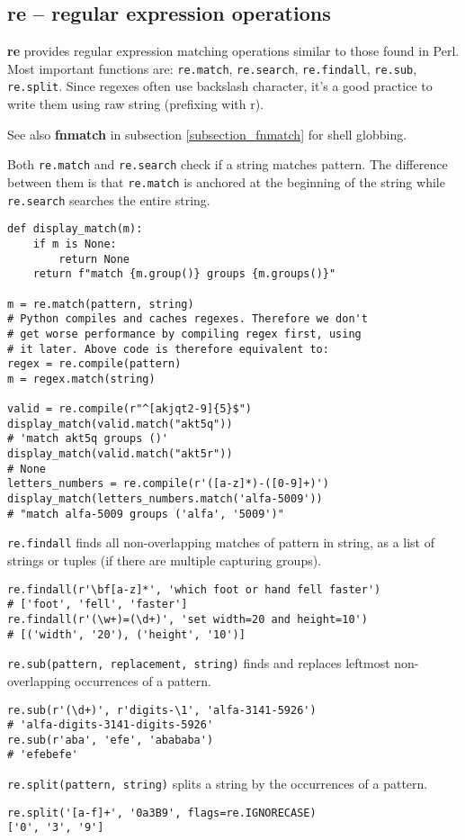 %

\subsection{re -- regular expression operations}
\textbf{re} provides regular expression matching operations similar to those found in Perl.
Most important functions are: \texttt{re.match}, \texttt{re.search}, \texttt{re.findall}, \texttt{re.sub}, \texttt{re.split}.
Since regexes often use backslash character, it's a good practice to write them using raw string (prefixing with r).

See also \textbf{fnmatch} in subsection \ref{subsection_fnmatch} for shell globbing.

Both \texttt{re.match} and \texttt{re.search} check if a string matches pattern.
The difference between them is that \texttt{re.match} is anchored at the beginning of the string while \texttt{re.search} searches the entire string.

\begin{verbatim}
def display_match(m):
    if m is None:
        return None
    return f"match {m.group()} groups {m.groups()}"

m = re.match(pattern, string)
# Python compiles and caches regexes. Therefore we don't
# get worse performance by compiling regex first, using
# it later. Above code is therefore equivalent to:
regex = re.compile(pattern)
m = regex.match(string)

valid = re.compile(r"^[akjqt2-9]{5}$")
display_match(valid.match("akt5q"))
# 'match akt5q groups ()'
display_match(valid.match("akt5r"))
# None
letters_numbers = re.compile(r'([a-z]*)-([0-9]+)')
display_match(letters_numbers.match('alfa-5009'))
# "match alfa-5009 groups ('alfa', '5009')"
\end{verbatim}

\texttt{re.findall} finds all non-overlapping matches of pattern in string, as a list of strings or tuples (if there are multiple capturing groups).
\begin{verbatim}
re.findall(r'\bf[a-z]*', 'which foot or hand fell faster')
# ['foot', 'fell', 'faster']
re.findall(r'(\w+)=(\d+)', 'set width=20 and height=10')
# [('width', '20'), ('height', '10')]
\end{verbatim}

\texttt{re.sub(pattern, replacement, string)} finds and replaces leftmost non-overlapping occurrences of a pattern.
\begin{verbatim}
re.sub(r'(\d+)', r'digits-\1', 'alfa-3141-5926')
# 'alfa-digits-3141-digits-5926'
re.sub(r'aba', 'efe', 'abababa')
# 'efebefe'
\end{verbatim}

\texttt{re.split(pattern, string)} splits a string by the occurrences of a pattern.
\begin{verbatim}
re.split('[a-f]+', '0a3B9', flags=re.IGNORECASE)
['0', '3', '9']
\end{verbatim}
%
